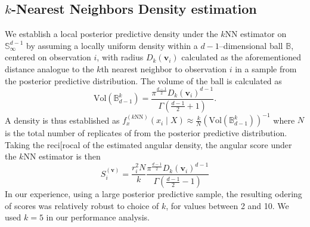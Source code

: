 
\subsection{$k$-Nearest Neighbors Density estimation}
We establish a local posterior predictive density under the $k$NN estimator 
    \citep{mack1979} on $\mathbb{S}_{\infty}^{d-1}$ by assuming a locally 
    uniform density within a $d-1$--dimensional ball $\mathbb{B}$, centered on 
    observation $i$, with radius $D_{k}(\bm{v}_i)$ calculated as the aforementioned
    distance analogue  to 
    the $k$th nearest neighbor to observation $i$ in a sample from the 
    posterior predictive distribution. The volume of the ball is calculated as
    \begin{equation}
        \label{eq:vol_sphere}
        \text{Vol}(\mathbb{B}_{d-1}^k) =
        \frac{\pi^{\frac{d-1}{2}}D_{k}(\bm{v}_i)^{d-1}}{
            \Gamma\left(\frac{d-1}{2} + 1\right)}.
    \end{equation}
    A density is thus established as 
    $f_{x}^{(k\text{NN})}(x_i\mid X) \approx 
        \frac{k}{N}\left(\text{Vol}(\mathbb{B}_{d-1}^k)\right)^{-1}$
    where $N$ is the total number of replicates of from the posterior predictive
    distribution.  Taking the reci[rocal of the estimated angular density, 
    the angular score under the $k$NN estimator is then
    \begin{equation}
        \label{eq:ad_knn_h}
        S_i^{(\bm{v})} = \frac{r_i^{2}N}{k}
            \frac{\pi^{\frac{d-1}{2}}D_{k}(\bm{v}_i)^{d-1}}{
            \Gamma\left(\frac{d-1}{2} - 1\right)}
    \end{equation}
    In our experience, using a large posterior predictive sample, 
    the resulting odering of scores was relatively robust to choice of $k$, for
    values between 2 and 10.  We used $k = 5$ in our performance analysis.
